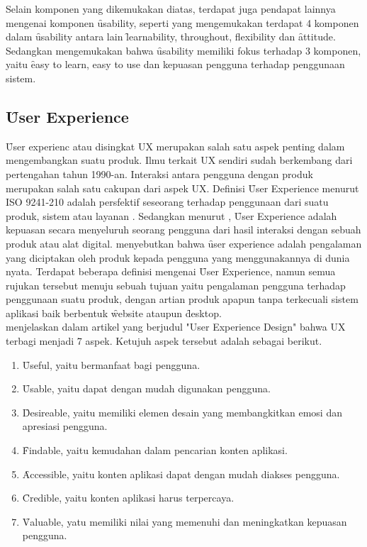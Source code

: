 Selain komponen yang dikemukakan \citeauthor{article.5ux} diatas, terdapat juga pendapat lainnya mengenai komponen \f{usability}, seperti \citet{buku.shackel} yang mengemukakan terdapat 4 komponen dalam \f{usability} antara lain \f{learnability, throughout, flexibility} dan \f{attitude}. Sedangkan \citet{paper.smith} mengemukakan bahwa \f{usability} memiliki fokus terhadap 3 komponen, yaitu \f{easy to learn, easy to use} dan kepuasan pengguna terhadap penggunaan sistem.
\subsection{\f{User Experience}}\label{subsec:userexperience}
\f{User experienc} atau disingkat UX merupakan salah satu aspek penting dalam mengembangkan suatu produk. Ilmu terkait UX sendiri sudah berkembang dari pertengahan tahun 1990-an. Interaksi antara pengguna dengan produk merupakan salah satu cakupan dari aspek UX. Definisi \f{User Experience} menurut ISO 9241-210 adalah persfektif seseorang terhadap penggunaan dari suatu produk, sistem atau layanan \citep{buku.alsos}. Sedangkan menurut \citet{article.nielsen}, \f{User Experience} adalah kepuasan secara menyeluruh seorang pengguna dari hasil interaksi dengan sebuah produk atau alat digital. \citet{buku.rubin} menyebutkan bahwa \f{user experience} adalah pengalaman yang diciptakan oleh produk kepada pengguna yang menggunakannya di dunia nyata.
Terdapat beberapa definisi mengenai \f{User Experience}, namun semua rujukan tersebut menuju sebuah tujuan yaitu pengalaman pengguna terhadap penggunaan suatu produk, dengan artian produk apapun tanpa terkecuali sistem aplikasi baik berbentuk \f{website} ataupun \f{desktop}.
\newline\\
\citet{article.peter} menjelaskan dalam artikel yang berjudul "User Experience Design" bahwa UX terbagi menjadi 7 aspek. Ketujuh aspek tersebut adalah sebagai berikut.
\begin{enumerate}
	\item \f{Useful}, yaitu bermanfaat bagi pengguna.
	\item \f{Usable}, yaitu dapat dengan mudah digunakan pengguna.
	\item \f{Desireable}, yaitu memiliki elemen desain yang membangkitkan emosi dan apresiasi pengguna.
	\item \f{Findable}, yaitu kemudahan dalam pencarian konten aplikasi.
	\item \f{Accessible}, yaitu konten aplikasi dapat dengan mudah diakses pengguna. 
	\item \f{Credible}, yaitu konten aplikasi harus terpercaya.
	\item \f{Valuable}, yatu memiliki nilai yang memenuhi dan meningkatkan kepuasan pengguna.
\end{enumerate}
